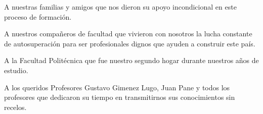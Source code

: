 \begin{thankspage} 
A nuestras familias y amigos que nos dieron su apoyo incondicional en este proceso de formación.

A nuestros compañeros de facultad que vivieron con nosotros la lucha constante de autosuperación para ser profesionales dignos que ayuden a construir este país.

A la Facultad Politécnica que fue nuestro segundo hogar durante nuestros años de estudio.

A los queridos Profesores Gustavo Gimenez Lugo, Juan Pane y todos los profesores que dedicaron su tiempo en transmitirnos sus conocimientos sin recelos.

\end{thankspage}